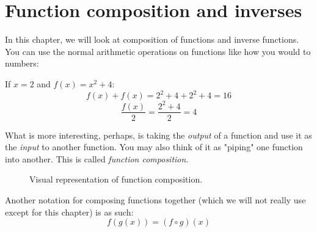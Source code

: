 
\section{Function composition and inverses}
In this chapter, we will look at composition of functions and inverse functions. You can use the normal arithmetic operations on functions like how you would to numbers:

\begin{example}
  If \(x=2\) and \(f(x)=x^2+4\):
  \begin{equation*}
    f(x)+f(x) = 2^2+4+2^2+4=16 
  \end{equation*}
  \begin{equation*}
    \frac{f(x)}{2} = \frac{2^2+4}{2} = 4 
  \end{equation*}
\end{example}

What is more interesting, perhaps, is taking the \textit{output} of a function and use it as the \textit{input} to another function. You may also think of it as "piping" one function into another. This is called \emph{function composition}.


\begin{figure}[h]
  \centering
  \caption{Visual representation of function composition.\protect\footnotemark}
\end{figure} 

Another notation for composing functions together (which we will not really use except for this chapter) is as such:
\begin{equation*}
  f(g(x))=(f \circ g)(x) 
\end{equation*}

